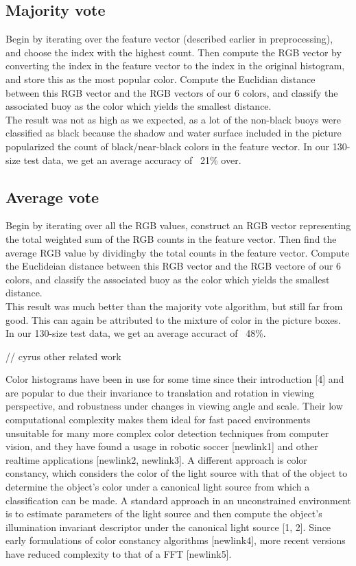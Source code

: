 \documentclass{article} %
\begin{document}
\subsection{Majority vote}
Begin by iterating over the feature vector (described earlier in preprocessing), and choose the index with the highest count. Then compute the RGB vector by converting the index in the feature vector to the index in the original histogram, and store this as the most popular color. Compute the Euclidian distance between this RGB vector and the RGB vectors of our 6 colors, and classify the associated buoy as the color which yields the smallest distance.\\
The result was not as high as we expected, as a lot of the non-black buoys were classified as black because the shadow and water surface included in the picture popularized the count of black/near-black colors in the feature vector. In our 130-size test data, we get an average accuracy of ~21\% over.

\subsection{Average vote}
Begin by iterating over all the RGB values, construct an RGB vector representing the total weighted sum of the RGB counts in the feature vector. Then find the average RGB value by dividingby the total counts in the feature vector. Compute the Euclideian distance between this RGB vector and the RGB vectore of our 6 colors, and classify the associated buoy as the color which yields the smallest distance.\\
This result was much better than the majority vote algorithm, but still far from good. This can again be attributed to the mixture of color in the picture boxes. In our 130-size test data, we get an average accuract of ~48\%.

// cyrus other related work

Color histograms have been in use for some time since their introduction [4] and are popular to due their invariance to translation and rotation in viewing perspective, and robustness under changes in viewing angle and scale. Their low computational complexity makes them ideal for fast paced environments unsuitable for many more complex color detection techniques from computer vision, and they have found a usage in robotic soccer [newlink1] and other realtime applications [newlink2, newlink3]. A different approach is color constancy, which considers the color of the light source with that of the object to determine the object's color under a canonical light source from which a classification can be made. A standard approach in an unconstrained environment is to estimate parameters of the light source and then compute the object's illumination invariant descriptor under the canonical light source [1, 2]. Since early formulations of color constancy algorithms [newlink4], more recent versions have reduced complexity to that of a FFT [newlink5]. 
\end{document}
